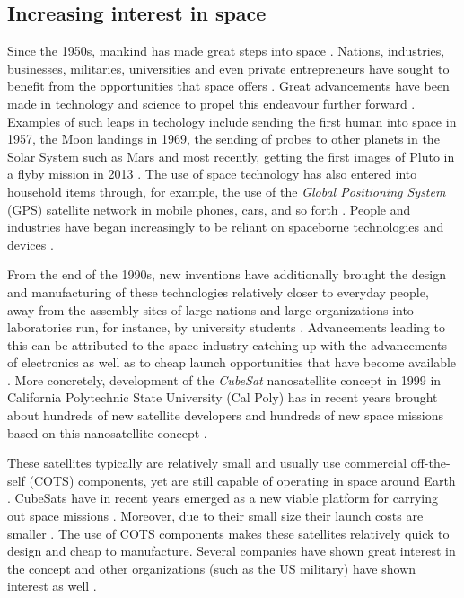 \documentclass[english,12pt,a4paper,pdftex,elec,utf8]{aaltothesis}
\begin{document}
\thispagestyle{empty}
\subsection{Increasing interest in space}
Since the 1950s, mankind has made great steps into space \cite{aftersputnik}. Nations, industries, businesses, militaries, universities and even private entrepreneurs have sought to benefit from the opportunities that space offers \cite{aftersputnik, rocketeers, accesstospace}. Great advancements have been made in technology and science to propel this endeavour further forward \cite{aftersputnik}. Examples of such leaps in techology include sending the first human into space in 1957, the Moon landings in 1969, the sending of probes to other planets in the Solar System such as Mars and most recently, getting the first images of Pluto in a flyby mission in 2013 \cite{aftersputnik, pluto}. The use of space technology has also entered into household items through, for example, the use of the \textit{Global Positioning System} (GPS) satellite network in mobile phones, cars, and so forth \cite{satcommunications}. People and industries have began increasingly to be reliant on spaceborne technologies and devices \cite{satcommunications}.\par
From the end of the 1990s, new inventions have additionally brought the design and manufacturing of these technologies relatively closer to everyday people, away from the assembly sites of large nations and large organizations into laboratories run, for instance, by university students \cite{bouwmeester}. Advancements leading to this can be attributed to the space industry catching up with the advancements of electronics as well as to cheap launch opportunities that have become available \cite{cubesatevolution, launchmarket}. More concretely, development of the \textit{CubeSat} nanosatellite concept in 1999 in California Polytechnic State University (Cal Poly) has in recent years brought about hundreds of new satellite developers and hundreds of new space missions based on this nanosatellite concept \cite{bouwmeester, cubesatevolution, cds}. \par 
These satellites typically are relatively small and usually use commercial off-the-self (COTS) components, yet are still capable of operating in space around Earth \cite{bouwmeester, cubesatevolution}. CubeSats have in recent years emerged as a new viable platform for carrying out space missions \cite{cubesatevolution}. Moreover, due to their small size their launch costs are smaller \cite{launchmarket}. The use of COTS components makes these satellites relatively quick to design and cheap to manufacture. Several companies have shown great interest in the concept and other organizations (such as the US military) have shown interest as well \cite{bouwmeester, cubesatevolution, launchmarket}.\par 
\end{document}
